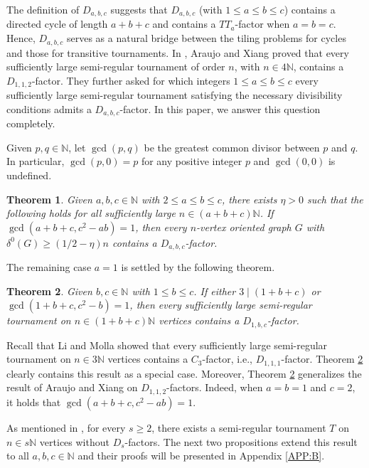 \documentclass[11pt,a4paper,reqno]{amsart}
\newtheorem{theorem}{Theorem}[section]
\theoremstyle{definition} %
\begin{document}
The definition of $D_{a, b, c}$ suggests that $D_{a,b,c}$ (with $1\leqslant a\leqslant b\leqslant c$) contains a directed cycle of length $a+b+c$ and contains a $TT_a$-factor when $a=b=c$.
Hence, $D_{a, b, c}$ serves as a natural bridge between the tiling problems for cycles and those for transitive tournaments. In \cite{araujoARXIV2025}, Araujo and Xiang proved that every sufficiently large semi-regular tournament of order $n$, with $n\in 4\mathbb{N}$, contains a $D_{1,1,2}$-factor. They further asked for which integers $1\leqslant a \leqslant b\leqslant c$ every sufficiently large semi-regular tournament satisfying the necessary divisibility conditions admits a $D_{a,b,c}$-factor. In this paper, we answer this question completely. 



Given $p, q\in \mathbb{N}$, let $\gcd(p,q)$ be the greatest common divisor between $p$ and $q$. In particular, $\gcd(p,0)=p$ for any positive integer $p$ and $\gcd(0,0)$ is undefined.

\begin{theorem}\label{THM-abc}
Given $a,b,c\in \mathbb{N}$ with $2\leqslant a\leqslant b\leqslant c$, there exists \(\eta>0\) such that the following holds for all sufficiently large \(n\in (a+b+c)\mathbb{N}\). If \(\gcd(a+b+c,c^2-ab)=1\), then every \(n\)-vertex oriented graph \(G\) with \(\delta^0(G)\geqslant (1/2-\eta)n\) contains a \(D_{a,b,c}\)-factor.
\end{theorem}

The remaining case \(a=1\) is settled by the following theorem.

\begin{theorem}\label{THM-1bc}
Given \(b,c\in \mathbb{N}\) with \(1\leqslant b\leqslant c\). If either \(3\mid (1+b+c)\) or \(\gcd(1+b+c,c^2-b)=1\), then every sufficiently large semi-regular tournament on \(n\in (1+b+c)\mathbb{N}\) vertices contains a \(D_{1,b,c}\)-factor.
\end{theorem}



Recall that Li and Molla \cite{liEJC26} showed that every sufficiently large semi-regular tournament on $n\in 3\mathbb{N}$ vertices contains a $C_3$-factor, i.e., $D_{1,1,1}$-factor. Theorem \ref{THM-1bc} clearly contains this result as a special case. Moreover, Theorem \ref{THM-1bc} generalizes the result of Araujo and Xiang on $D_{1,1,2}$-factors. Indeed, when $a=b=1$ and $c=2$, it holds that $\gcd(a+b+c,c^2-ab)=1$.

As mentioned in \cite{araujoARXIV2025}, for every $s\geqslant 2$, there exists a semi-regular tournament $T$ on $n\in s\mathbb{N}$ vertices without $D_s$-factors.  
The next two propositions extend this result to all $a,b,c\in \mathbb{N}$ and their proofs  will be presented in Appendix \ref{APP:B}.
\end{document}
